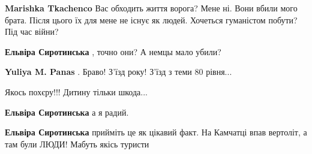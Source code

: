\begin{itemize}
\begin{itemize}
\begin{itemize}
\textbf{Marishka Tkachenco} Вас обходить життя ворога? Мене ні. Вони вбили мого брата. Після цього їх для мене не існує як людей. Хочеться гуманістом побути? Під час війни?

 
\textbf{Ельвіра Сиротинська} , точно они? А немцы мало убили?

 
\textbf{Yuliya M. Panas} . Браво! З'їзд року! З'їзд з теми 80 рівня... 🤣
\end{itemize}

 
Якось похєру!!! Дитину тільки шкода...

 
\textbf{Ельвіра Сиротинська} а я радий.

 
\textbf{Ельвіра Сиротинська} прийміть це як цікавий факт. На Камчатці впав вертоліт, а там були ЛЮДИ! Мабуть якісь туристи \Smiley[1.0][yellow]

\begin{itemize}
 

\end{itemize}
\end{itemize}
\end{itemize}
